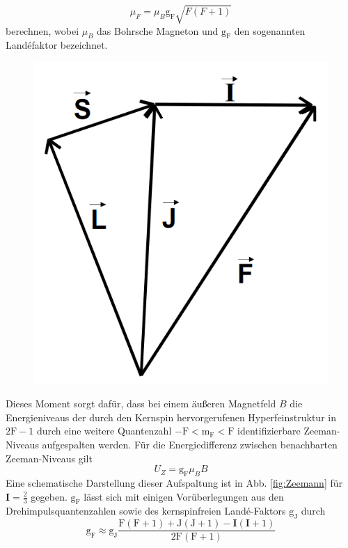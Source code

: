\begin{equation}
  \mu_F = \mu_B \text{g}_\text{F} \sqrt{F(F+1)}
  \label{eqn:mu_F}
\end{equation}
berechnen, wobei $\mu_B$ das Bohrsche Magneton und $\text{g}_\text{F}$  den sogenannten Landéfaktor bezeichnet.
\begin{figure}
  \includegraphics{./Kopplung.PNG}
  \caption{\cite{Anleitung}}
  \label{fig:F}
\end{figure}
Dieses Moment sorgt dafür, dass bei einem äußeren Magnetfeld $B$ die Energieniveaus der durch den Kernspin hervorgerufenen Hyperfeinstruktur in $2\text{F}-1$ durch eine weitere Quantenzahl $-\text{F}<\text{m}_\text{F}<\text{F}$ identifizierbare Zeeman-Niveaus aufgespalten werden. Für die Energiedifferenz zwischen benachbarten Zeeman-Niveaus gilt
\begin{equation}
  U_{Z}=\text{g}_\text{F}\mu_B B
  \label{eqn:U}
\end{equation}
Eine schematische Darstellung dieser Aufspaltung ist in Abb. \ref{fig:Zeemann} für $\mathbf{I}= \frac{2}{3}$ gegeben.
$\text{g}_\text{F}$ lässt sich mit einigen Vorüberlegungen aus den Drehimpulsquantenzahlen sowie des kernspinfreien Landé-Faktors $\text{g}_\text{J}$ durch
\begin{equation}
  \text{g}_\text{F} \approx  \text{g}_\text{J} \frac{\text{F}\left(\text{F}+1\right)+\text{J}\left(\text{J}+1\right)-\mathbf{I}\left(\mathbf{I}+1\right)}{2\text{F}\left(\text{F}+1\right)}
  \label{eqn:gf}
\end{equation}
